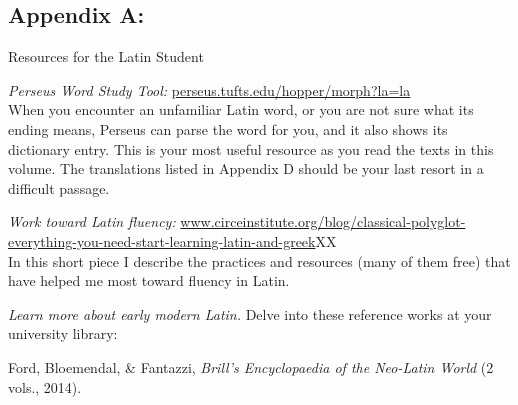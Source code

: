\documentclass[20pt, twoside]{extarticle}
\begin{document}
\titleformat{\part}[block]{\vspace{-2.05em}\huge\centering}{}{0em}{}
\titlespacing{\part}{0em}{0em}{0em}
\newcommand{\hi}{\hangindent=2.7em}
\newcommand{\dashes}{—\hspace{-1.2pt}—, —\hspace{-1.2pt}—\ }
\newcommand{\dash}{—\hspace{-1.2pt}—,\ }
\newcommand{\ssm}{\fontsize{16.5pt}{17pt}\selectfont}
\small
\begin{singlespace}
\begin{en}

\thispagestyle{empty}
\part[Appendix A: Resources]{Appendix A:}
{\LARGE\centering Resources for the Latin Student\par}

\vspace{1.5em}
\setlength{\parskip}{1.3em}
\noindent
\emph{Perseus Word Study Tool:} \url{perseus.tufts.edu/hopper/morph?la=la}\\
When you encounter an unfamiliar Latin word, or you are not sure what its ending means, Perseus can parse the word for you, and it also shows its dictionary entry. This is your most useful resource as you read the texts in this volume. The translations listed in Appendix D should be your last resort in a difficult passage.

\noindent
\emph{Work toward Latin fluency:} \href{https://www.circeinstitute.org/blog/classical-polyglot-everything-you-need-start-learning-latin-and-greek}{www.circeinstitute.org/blog/classical-polyglot-everything-you-need-start-learning-latin-and-greek}{\fleur XX}\\
In this short piece I describe the practices and resources (many of them free) that have helped me most toward fluency in Latin.

\noindent
\emph{Learn more about early modern Latin.} Delve into these reference works at your university library:

\vspace*{.2em}
\setlength{\parskip}{.5em}
\noindent Ford, Bloemendal, \& Fantazzi, \emph{Brill’s Encyclopaedia of the Neo-Latin World} (2 vols., 2014).


\end{en}
\end{singlespace}
\end{document}
